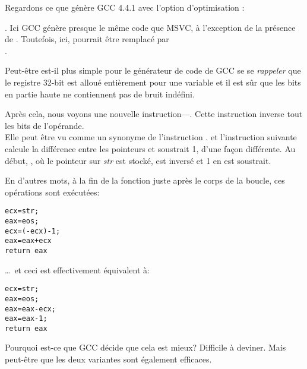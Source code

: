 Regardons ce que génère GCC 4.4.1 avec l'option d'optimisation \Othree:



.
Ici GCC génère presque le même code que MSVC, à l'exception de la présence de \MOVZX.
Toutefois, ici, \MOVZX pourrait être remplacé par\\
.

Peut-être est-il plus simple pour le générateur de code de GCC se se \emph{rappeler}
que le registre 32-bit \EDX est alloué entièrement pour une variable \Tchar et il
est sûr que les bits en partie haute ne contiennent pas de bruit indéfini.

\label{strlen_NOT_ADD}

Après cela, nous voyons une nouvelle instruction---\NOT. Cette instruction inverse
tout les bits de l'opérande. \\
Elle peut être vu comme un synonyme de l'instruction .
\NOT et l'instruction suivante \ADD calcule la différence entre les pointeurs et
soustrait 1, d'une façon différente.
Au début, \ECX, où le pointeur sur \emph{str} est stocké, est inversé et 1 en est soustrait.

En d'autres mots, à la fin de la fonction juste après le corps de la boucle, ces opérations
sont exécutées:

\begin{lstlisting}[style=customc]
ecx=str;
eax=eos;
ecx=(-ecx)-1;
eax=eax+ecx
return eax
\end{lstlisting}

\dots~et ceci est effectivement équivalent à:

\begin{lstlisting}[style=customc]
ecx=str;
eax=eos;
eax=eax-ecx;
eax=eax-1;
return eax
\end{lstlisting}

Pourquoi est-ce que GCC décide que cela est mieux? Difficile à deviner.
Mais peut-être que les deux variantes sont également efficaces.
